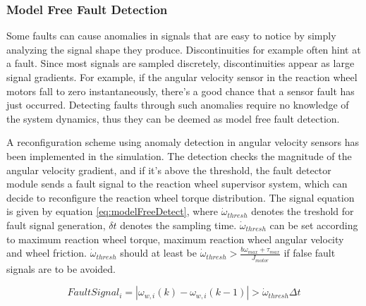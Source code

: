 \subsubsection{Model Free Fault Detection}
\label{sec:ModelFreeFD}

Some faults can cause anomalies in signals that are easy to notice by simply analyzing the signal shape they produce. Discontinuities for example often hint at a fault. Since most signals are sampled discretely, discontinuities appear as large signal gradients. For example, if the angular velocity sensor in the reaction wheel motors fall to zero instantaneously, there's a good chance that a sensor fault has just occurred. Detecting faults through such anomalies require no knowledge of the system dynamics, thus they can be deemed as model free fault detection. 

A reconfiguration scheme using anomaly detection in angular velocity sensors has been implemented in the simulation. The detection checks the magnitude of the angular velocity gradient, and if it's above the threshold, the fault detector module sends a fault signal to the reaction wheel supervisor system, which can decide to reconfigure the reaction wheel torque distribution. The signal equation is given by equation \ref{eq:modelFreeDetect}, where $\dot{\omega}_{thresh}$ denotes the treshold for fault signal generation, $\delta t$ denotes the sampling time.  $\dot{\omega}_{thresh}$ can be set according to maximum reaction wheel torque, maximum reaction wheel angular velocity and wheel friction. $\dot{\omega}_{thresh}$ should at  least be $\dot{\omega}_{thresh} > \frac{b \omega_{max} + \tau_{max}}{J_{motor}}$ if false fault signals are to be avoided.

\begin{equation}
\label{eq:modelFreeDetect}
FaultSignal_i = |\omega_{w,i}(k) - \omega_{w,i}(k-1)| > \dot{\omega}_{thresh} \Delta t
\end{equation}